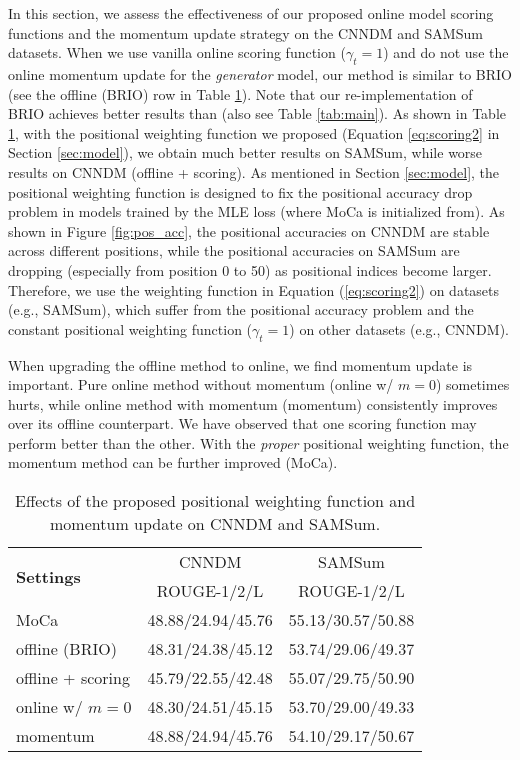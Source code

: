 \documentclass{article}
\begin{document}
In this section, we assess the effectiveness of our proposed online model scoring functions and the momentum update strategy on the CNNDM and SAMSum datasets. When we use vanilla online scoring function ($\gamma_t = 1$) and do not use the online momentum update for the \emph{generator} model, our method is similar to BRIO \cite{liu-etal-2022-brio} (see the offline (BRIO) row in Table \ref{tab:ablation}). Note that our re-implementation of BRIO achieves better results than \cite{liu-etal-2022-brio} (also see Table \ref{tab:main}). As shown in Table \ref{tab:ablation}, with the positional weighting function we proposed (Equation  \ref{eq:scoring2} in Section \ref{sec:model}), we obtain much better results on SAMSum, while worse results on CNNDM (offline + scoring). As mentioned in Section \ref{sec:model}, the positional weighting function is designed to fix the positional accuracy drop problem in models trained by the MLE loss (where MoCa is initialized from). As shown in Figure \ref{fig:pos_acc}, the positional accuracies on CNNDM are stable across different positions, while the positional accuracies on SAMSum are dropping (especially from position 0 to 50) as positional indices become larger.
Therefore, we use the weighting function in Equation (\ref{eq:scoring2}) on datasets (e.g., SAMSum), which suffer from the positional accuracy problem and the constant positional weighting function ($\gamma_t = 1$) on other datasets (e.g., CNNDM).

When upgrading the offline method to online, we find momentum update is important. Pure online method without momentum (online w/ $m=0$) sometimes hurts, while online method with momentum (momentum) consistently improves over its offline counterpart. We have observed that one scoring function may perform better than the other. With the \emph{proper} positional weighting function, the momentum method can be further improved (MoCa).

\begin{table}[t]
\small
\begin{center}
\begin{tabular}{l|c|c}
\hline
\multirow{2}{*}{\bf Settings}  & CNNDM & SAMSum  \\
 & ROUGE-1/2/L & ROUGE-1/2/L \\

\hline
MoCa & 48.88/24.94/45.76 & 55.13/30.57/50.88 \\
\hline
offline (BRIO) & 48.31/24.38/45.12 & 53.74/29.06/49.37 \\
offline + scoring & 45.79/22.55/42.48 & 55.07/29.75/50.90 \\
online w/ $m=0$ & 48.30/24.51/45.15 & 53.70/29.00/49.33 \\
momentum & 48.88/24.94/45.76 & 54.10/29.17/50.67 \\

\hline

\end{tabular}
\end{center}
\caption{Effects of the proposed positional weighting function and momentum update on CNNDM and SAMSum.}
\label{tab:ablation}
\end{table}
\end{document}

